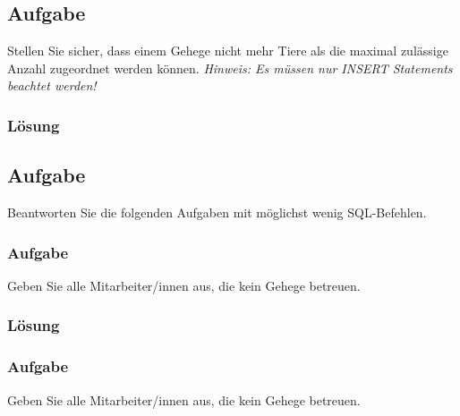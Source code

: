 \label{subsec:uebung_01.aufgabe_09}
\subsection{Aufgabe}
Stellen Sie sicher, dass einem Gehege nicht mehr Tiere als die maximal zulässige Anzahl zugeordnet werden können.
\textit{Hinweis: Es müssen nur INSERT Statements beachtet werden!}

\label{subsubsec:uebung_01.aufgabe_9.loesung}
\subsubsection*{Lösung}


\label{subsec:uebung_01.aufgabe_10}
\subsection{Aufgabe}
Beantworten Sie die folgenden Aufgaben mit möglichst wenig SQL-Befehlen.

\label{subsec:uebung_01.aufgabe_10a}
\subsubsection{Aufgabe}
Geben Sie alle Mitarbeiter/innen aus, die kein Gehege betreuen.

\label{subsubsec:uebung_01.aufgabe_10a.loesung}
\subsubsection*{Lösung}

\label{subsec:uebung_01.aufgabe_10b}
\subsubsection{Aufgabe}
Geben Sie alle Mitarbeiter/innen aus, die kein Gehege betreuen.

